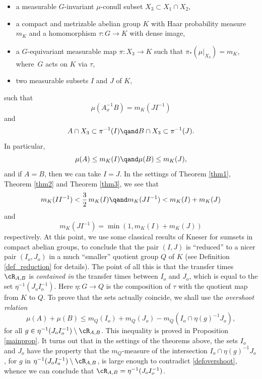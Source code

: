 \begin{itemize}
\item a measurable $G$-invariant $\mu$-conull subset $X_3 \subset X_1 \cap X_2$,

\item a compact and metrizable abelian group $K$ with Haar probability measure $m_K$ and
a homomorphism $\tau : G \to K$ with dense image,

\item a $G$-equivariant measurable map $\pi : X_3 \to K$ such that $\pi_*(\mu |_{X_3}) = m_K$, where~$G$ acts on $K$ via $\tau$,

\item two measurable subsets $I$ and $J$ of $K$,
\end{itemize}
such that
\[
\mu(A_x^{-1}B) = m_K(JI^{-1})
\]
and
\[
A \cap X_3 \subset \pi^{-1}(I) \qand B \cap X_3 \subset \pi^{-1}(J).
\]
In particular,
\[
\mu(A) \leq m_K(I) \qand \mu(B) \leq m_K(J),
\]
and if $A = B$, then we can take $I = J$. In the settings of Theorem \ref{thm1}, Theorem \ref{thm2} and Theorem \ref{thm3}, we see that
\[
m_K(I I^{-1}) < \frac{3}{2}\, m_K(I)
\qand
m_K(JI^{-1}) < m_K(I) + m_K(J)
\]
and
\[
m_K(J I^{-1}) = \min(1,m_K(I) + m_K(J))
\]
respectively. At this point, we use some classical results \cite{Kneser} of Kneser for sumsets in compact abelian groups,
to conclude that the pair $(I,J)$ is ``reduced'' to a nicer pair $(I_o,J_o)$ in a much ``smaller'' quotient group $Q$ of $K$ (see
Definition \ref{def_reduction} for details). The point of all this is that the transfer times $\cR_{A,B}$ is \emph{contained in} the
transfer times between $I_o$ and $J_o$, which is equal to the set $\eta^{-1}(J_oI_o^{-1})$. Here $\eta : G \to Q$ is the composition
of $\tau$ with the quotient map from $K$ to $Q$. To prove that the sets actually coincide,
we shall use the \emph{overshoot relation}
\begin{equation}
\label{defovershoot}
\mu(A) + \mu(B) \leq m_Q(I_o) + m_Q(J_o) - m_Q(I_o \cap \eta(g)^{-1}J_o),
\end{equation}
for all $g \in \eta^{-1}(J_o I_o^{-1}) \setminus \cR_{A,B}$. This inequality is proved in Proposition \ref{mainprop}. It turns out that in
the settings of the theorems above, the sets $I_o$ and $J_o$ have the property that the $m_Q$-measure of the
intersection $I_o \cap \eta(g)^{-1}J_o$, for $g$ in $\eta^{-1}(J_o I_o^{-1}) \setminus \cR_{A,B}$, is large enough to
contradict \eqref{defovershoot}, whence we can conclude that $\cR_{A,B} = \eta^{-1}(J_o I_o^{-1})$.

